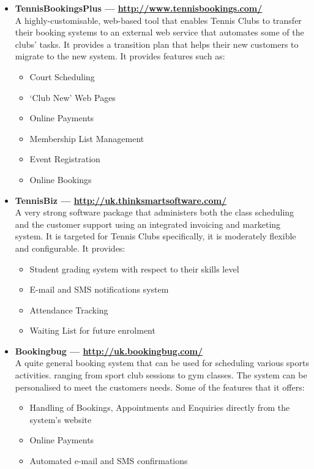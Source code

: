 \documentclass{l3proj}
\begin{document}
\begin{itemize}
\item \textbf{TennisBookingsPlus --- \url{http://www.tennisbookings.com/}}\\
A highly-customisable, web-based tool that enables Tennis Clubs to transfer their booking systems to an external web service that automates some of the clubs’ tasks. It provides a transition plan that helps their new customers to migrate to the new system. It provides features such as:\\
		\begin{itemize}
	\item Court Scheduling
	\item `Club New' Web Pages
	\item Online Payments
	\item Membership List Management
	\item Event Registration
	\item Online Bookings
		\end{itemize}
\item \textbf{TennisBiz --- \url{http://uk.thinksmartsoftware.com/}}\\
A very strong software package that administers both the class scheduling and the customer support using an integrated invoicing and marketing system. It is targeted for Tennis Clubs specifically, it is moderately flexible and configurable. It provides:
		\begin{itemize}
	\item Student grading system with respect to their skills level
	\item E-mail and SMS notifications system
	\item Attendance Tracking
	\item Waiting List for future enrolment
		\end{itemize}
\item \textbf{Bookingbug --- \url{http://uk.bookingbug.com/}}\\
A quite general booking system that can be used for scheduling various sports activities. ranging from sport club sessions to gym classes. The system can be personalised to meet the customers needs. Some of the features that it offers:
		\begin{itemize}
	\item Handling of Bookings, Appointments and Enquiries directly from the system’s website
	\item Online Payments
	\item Automated e-mail and SMS confirmations

\end{itemize}
\end{itemize}
\end{document}
